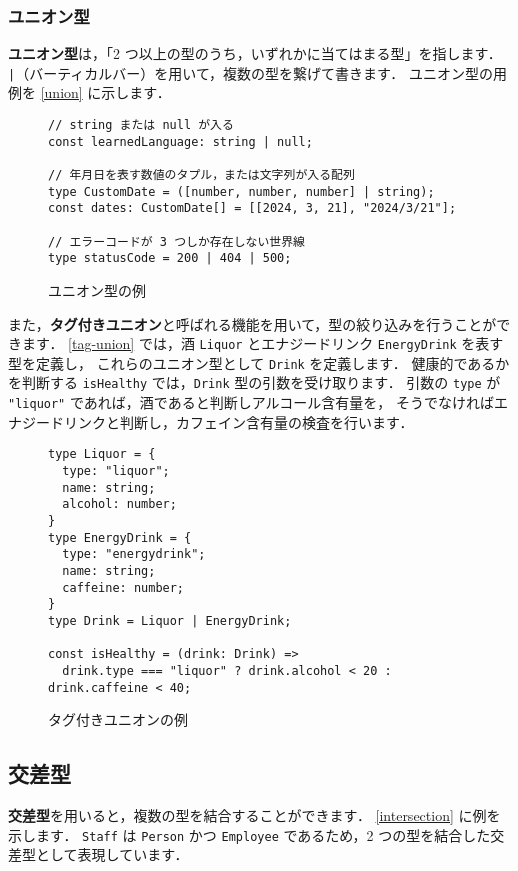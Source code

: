 \documentclass[a4j, 11pt]{jarticle}
\begin{document}
\subsubsection{ユニオン型}

\textbf{ユニオン型}は，「2 つ以上の型のうち，いずれかに当てはまる型」を指します．
\verb/|/（バーティカルバー）を用いて，複数の型を繋げて書きます．
ユニオン型の用例を \autoref{union} に示します．

\begin{figure}[H]
\caption{ユニオン型の例}
\label{union}
\begin{lstlisting}
// string または null が入る
const learnedLanguage: string | null;

// 年月日を表す数値のタプル，または文字列が入る配列
type CustomDate = ([number, number, number] | string);
const dates: CustomDate[] = [[2024, 3, 21], "2024/3/21"];

// エラーコードが 3 つしか存在しない世界線
type statusCode = 200 | 404 | 500;
\end{lstlisting}
\end{figure}

また，\textbf{タグ付きユニオン}と呼ばれる機能を用いて，型の絞り込みを行うことができます．
\autoref{tag-union} では，酒 \verb|Liquor| とエナジードリンク \verb|EnergyDrink| を表す型を定義し，
これらのユニオン型として \verb|Drink| を定義します．
健康的であるかを判断する \verb|isHealthy| では，\verb|Drink| 型の引数を受け取ります．
引数の \verb|type| が \verb|"liquor"| であれば，酒であると判断しアルコール含有量を，
そうでなければエナジードリンクと判断し，カフェイン含有量の検査を行います．

\begin{figure}[H]
\caption{タグ付きユニオンの例}
\label{tag-union}
\begin{lstlisting}
type Liquor = {
  type: "liquor";
  name: string;
  alcohol: number;
}
type EnergyDrink = {
  type: "energydrink";
  name: string;
  caffeine: number;
}
type Drink = Liquor | EnergyDrink;

const isHealthy = (drink: Drink) =>
  drink.type === "liquor" ? drink.alcohol < 20 : drink.caffeine < 40;
\end{lstlisting}
\end{figure}

\subsection{交差型}

\textbf{交差型}を用いると，複数の型を結合することができます．
\autoref{intersection} に例を示します．
\verb|Staff| は \verb|Person| かつ \verb|Employee| であるため，2 つの型を結合した交差型として表現しています．
\end{document}
